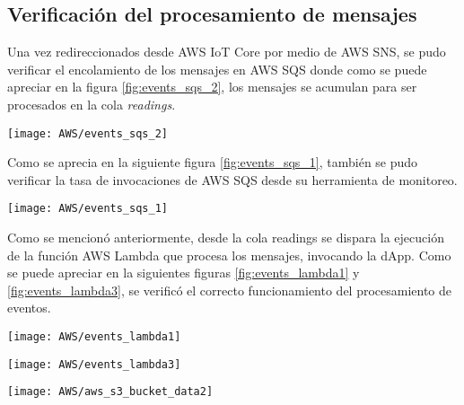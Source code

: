 \subsection{Verificación del procesamiento de mensajes }

Una vez redireccionados desde AWS IoT Core por medio de AWS SNS, se pudo verificar el encolamiento de los mensajes en AWS SQS donde como se puede apreciar en la figura \ref{fig:events_sqs_2}, los mensajes se acumulan para ser procesados en la cola \textit{readings}.

\begin{center}
   \texttt{[image: AWS/events\_sqs\_2]}
   \label{fig:events_sqs_2}
\end{center}

Como se aprecia en la siguiente figura \ref{fig:events_sqs_1}, también se pudo verificar la tasa de invocaciones de AWS SQS desde su herramienta de monitoreo.

\begin{center}
   \texttt{[image: AWS/events\_sqs\_1]}
   \label{fig:events_sqs_1}
\end{center}


Como se mencionó anteriormente, desde la cola readings se dispara la ejecución de la función AWS Lambda que procesa los mensajes, invocando la dApp. Como se puede apreciar en la siguientes figuras \ref{fig:events_lambda1} y \ref{fig:events_lambda3}, se verificó el correcto funcionamiento del procesamiento de eventos.


\begin{center}
   \texttt{[image: AWS/events\_lambda1]}
   \label{fig:events_lambda1}
\end{center}

\begin{center}
   \texttt{[image: AWS/events\_lambda3]}
   \label{fig:events_lambda3}
\end{center}

\begin{center}
   \texttt{[image: AWS/aws\_s3\_bucket\_data2]}
   \label{fig:aws_s3_bucket_data2}
\end{center}



